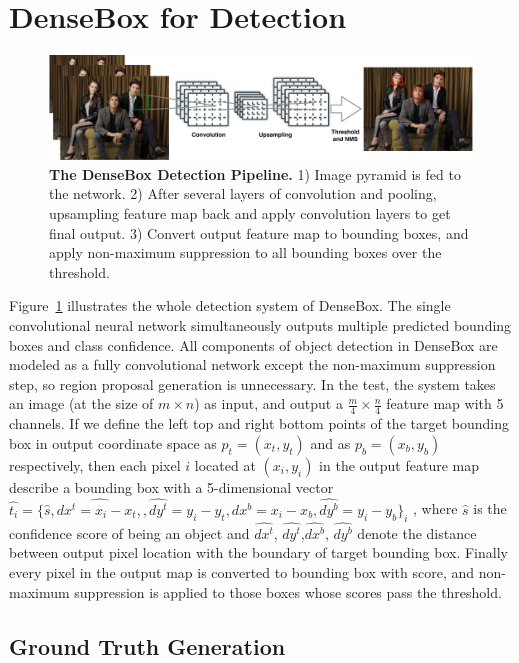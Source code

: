 \section{DenseBox for Detection }
\label{sec:model} 

\begin{figure}[!hbtp]
\centering
\includegraphics[scale=0.39]{figures/figure1-crop.pdf}
\caption{\textbf{The DenseBox Detection Pipeline.} 1) Image pyramid is fed to the network. 2) After several layers of convolution and pooling, upsampling feature map back and apply convolution layers to get final output. 3) Convert output feature map to bounding boxes, and apply non-maximum suppression to all bounding boxes over the threshold. }
\label{fig:fig_overview}
\end{figure}

Figure~\ref{fig:fig_overview} illustrates the whole detection system of DenseBox. The single convolutional neural network simultaneously outputs multiple predicted bounding boxes and class confidence. All components of object detection in DenseBox are modeled as a fully convolutional network except the non-maximum suppression step, so region proposal generation is unnecessary. In the test, the system takes an image (at the size of $m\times n$) as input, and output a $ \frac{m}{4} \times \frac{n}{4} $ feature map with 5 channels.
If we define the left top and right bottom points of the target bounding box in output coordinate space as $ p_t = (x_t, y_t)$ and as $ p_b = (x_b, y_b)$ respectively, then each pixel $i$ located at $(x_i, y_i)$ in the output feature map describe a bounding box with a 5-dimensional vector $\hat{t_i } = \{ \hat{s }, \hat{dx^{t}= x_i - x_t,},\hat{dy^{t}} = y_i - y_t,\hat{dx^{b}}= x_i - x_b,\hat{dy^{b}}= y_i - y_b \}_i$ , where $\hat{s }$ is the confidence score of being an object and $\hat{dx^{t}}$, $\hat{dy^{t}}$,$\hat{dx^{b}}$, $\hat{dy^{b}}$ denote the distance between output pixel location with the boundary of target bounding box. Finally every pixel in the output map is converted to bounding box with score, and non-maximum suppression is applied to those boxes whose scores pass the threshold. 

\subsection{Ground Truth Generation} 


